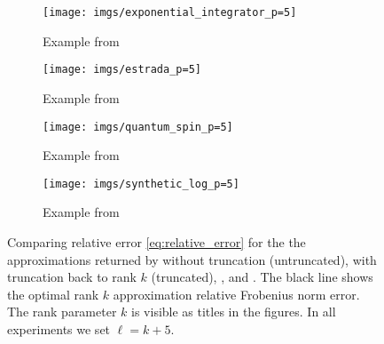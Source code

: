 \begin{figure}[ht]
\begin{subfigure}{.5\textwidth}
  \centering
  \texttt{[image: imgs/exponential\_integrator\_p=5]}  
  \caption{Example from }
\end{subfigure}
\begin{subfigure}{.5\textwidth}
  \centering
  \texttt{[image: imgs/estrada\_p=5]} 
  \caption{Example from }
\end{subfigure}
\begin{subfigure}{.5\textwidth}
  \centering
  \texttt{[image: imgs/quantum\_spin\_p=5]}  
  \caption{Example from }
\end{subfigure}
\begin{subfigure}{.5\textwidth}
  \centering
  \texttt{[image: imgs/synthetic\_log\_p=5]}  
  \caption{Example from }
\end{subfigure}
\caption{Comparing relative error  \eqref{eq:relative_error} for the the approximations returned by  without truncation (untruncated),  with truncation back to rank $k$ (truncated), , and . The black line shows the optimal rank $k$ approximation relative Frobenius norm error. The rank parameter $k$ is visible as titles in the figures. In all experiments we set $\ell = k+5$. }
\label{fig:relative_errors2}
\end{figure}

